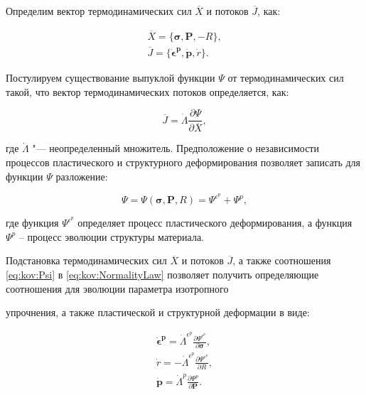 Определим вектор термодинамических сил $\overline{X}$ и потоков $\overline{J}$, как:

\begin{gather*}

\overline{X}=\{\boldsymbol{\sigma},\boldsymbol{P},-R\},\\

\overline{J}=\{\boldsymbol{\dot{\epsilon}^{p}},\dot{\boldsymbol{p}},\dot{r}\}.

\end{gather*}

Постулируем существование выпуклой  функции $\Psi$ от термодинамических сил такой, что вектор термодинамических потоков определяется, как:

\begin{equation}

\overline{J}=\dot{\Lambda}\frac{\partial \Psi}{\partial{\overline{X}}}, \label{eq:kov:NormalityLaw}

\end{equation}

где $\dot{\Lambda}$ "--- неопределенный множитель. Предположение о независимости процессов пластического и структурного деформирования позволяет записать для функции $\Psi$ разложение:

\begin{equation}

\Psi=\Psi(\boldsymbol{\sigma}, \boldsymbol{P}, R)=\Psi^{\epsilon^p}+\Psi^p, \label{eq:kov:Psi}

\end{equation}

где функция $\Psi^{\epsilon^p}$ определяет процесс пластического деформирования, а функция $\Psi^p$ -- процесс эволюции структуры материала.



Подстановка термодинамических сил $\overline{X}$ и потоков $\overline{J}$, а также соотношения \eqref{eq:kov:Psi} в \eqref{eq:kov:NormalityLaw} позволяет получить определяющие соотношения для эволюции параметра изотропного

упрочнения, а также  пластической и структурной деформации в виде:

\begin{gather}

\boldsymbol{\dot{\epsilon}^{p}}=\dot{\Lambda}^{\epsilon^p} \frac{\partial{\Psi^{\epsilon^p}}}{\partial{\boldsymbol{\sigma}}}, \label{eq:kov:NormalityLawPlast}\\

\dot{r}= - \dot{\Lambda}^{\epsilon^p}\frac{\partial \Psi^{\epsilon^p}}{\partial{R}}, \label{eq:kov:NormalityLawR}\\

\dot{\boldsymbol{p}}=\dot{\Lambda}^{p}\frac{\partial \Psi^{p}}{\partial{\boldsymbol{P}}}. \label{eq:kov:NormalityLawP}

\end{gather}

